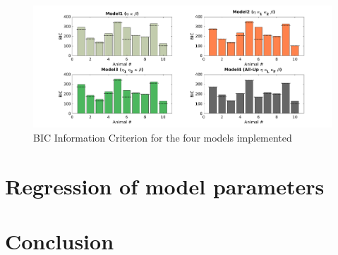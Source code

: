 \begin{figure}
    \includegraphics[scale=0.3]{figures/BIC_ModelCompare.png}
    \caption{BIC Information Criterion for the four models implemented}
    \label{fig:BIC}
\end{figure}

    

\section{Regression of model parameters}
\section{Conclusion}